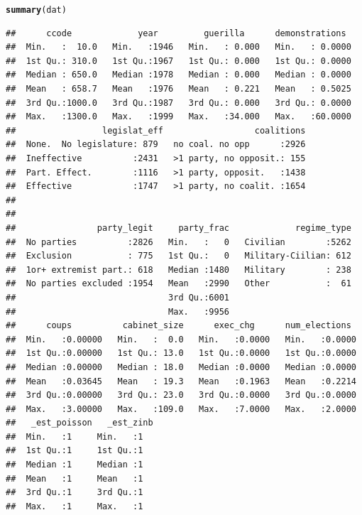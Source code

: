 \documentclass[onesided]{article}\usepackage[]{graphicx}\usepackage[]{color}
\makeatletter
\newcommand{\hlstd}[1]{\textcolor[rgb]{0.345,0.345,0.345}{#1}}%
\newcommand{\hlkwd}[1]{\textcolor[rgb]{0.737,0.353,0.396}{\textbf{#1}}}%
\newenvironment{kframe}{%
 \def\at@end@of@kframe{}%
 \ifinner\ifhmode%
  \def\at@end@of@kframe{\end{minipage}}%
  \begin{minipage}{\columnwidth}%
 \fi\fi%
 \def\FrameCommand##1{\hskip\@totalleftmargin \hskip-\fboxsep
 \colorbox{shadecolor}{##1}\hskip-\fboxsep
     \hskip-\linewidth \hskip-\@totalleftmargin \hskip\columnwidth}%
 \MakeFramed {\advance\hsize-\width
   \@totalleftmargin\z@ \linewidth\hsize
   \@setminipage}}%
 {\par\unskip\endMakeFramed%
 \at@end@of@kframe}
\newenvironment{knitrout}{}{} %
\makeatother
\begin{document}
\begin{knitrout}
\color{fgcolor}\begin{kframe}
\begin{alltt}
\hlkwd{summary}\hlstd{(dat)}
\end{alltt}
\begin{verbatim}
##      ccode             year         guerilla      demonstrations   
##  Min.   :  10.0   Min.   :1946   Min.   : 0.000   Min.   : 0.0000  
##  1st Qu.: 310.0   1st Qu.:1967   1st Qu.: 0.000   1st Qu.: 0.0000  
##  Median : 650.0   Median :1978   Median : 0.000   Median : 0.0000  
##  Mean   : 658.7   Mean   :1976   Mean   : 0.221   Mean   : 0.5025  
##  3rd Qu.:1000.0   3rd Qu.:1987   3rd Qu.: 0.000   3rd Qu.: 0.0000  
##  Max.   :1300.0   Max.   :1999   Max.   :34.000   Max.   :60.0000  
##                 legislat_eff                  coalitions  
##  None.  No legislature: 879   no coal. no opp      :2926  
##  Ineffective          :2431   >1 party, no opposit.: 155  
##  Part. Effect.        :1116   >1 party, opposit.   :1438  
##  Effective            :1747   >1 party, no coalit. :1654  
##                                                           
##                                                           
##                party_legit     party_frac             regime_type  
##  No parties          :2826   Min.   :   0   Civilian        :5262  
##  Exclusion           : 775   1st Qu.:   0   Military-Ciilian: 612  
##  1or+ extremist part.: 618   Median :1480   Military        : 238  
##  No parties excluded :1954   Mean   :2990   Other           :  61  
##                              3rd Qu.:6001                          
##                              Max.   :9956                          
##      coups          cabinet_size      exec_chg      num_elections   
##  Min.   :0.00000   Min.   :  0.0   Min.   :0.0000   Min.   :0.0000  
##  1st Qu.:0.00000   1st Qu.: 13.0   1st Qu.:0.0000   1st Qu.:0.0000  
##  Median :0.00000   Median : 18.0   Median :0.0000   Median :0.0000  
##  Mean   :0.03645   Mean   : 19.3   Mean   :0.1963   Mean   :0.2214  
##  3rd Qu.:0.00000   3rd Qu.: 23.0   3rd Qu.:0.0000   3rd Qu.:0.0000  
##  Max.   :3.00000   Max.   :109.0   Max.   :7.0000   Max.   :2.0000  
##   _est_poisson   _est_zinb
##  Min.   :1     Min.   :1  
##  1st Qu.:1     1st Qu.:1  
##  Median :1     Median :1  
##  Mean   :1     Mean   :1  
##  3rd Qu.:1     3rd Qu.:1  
##  Max.   :1     Max.   :1
\end{verbatim}
\end{kframe}
\end{knitrout}
\end{document}
